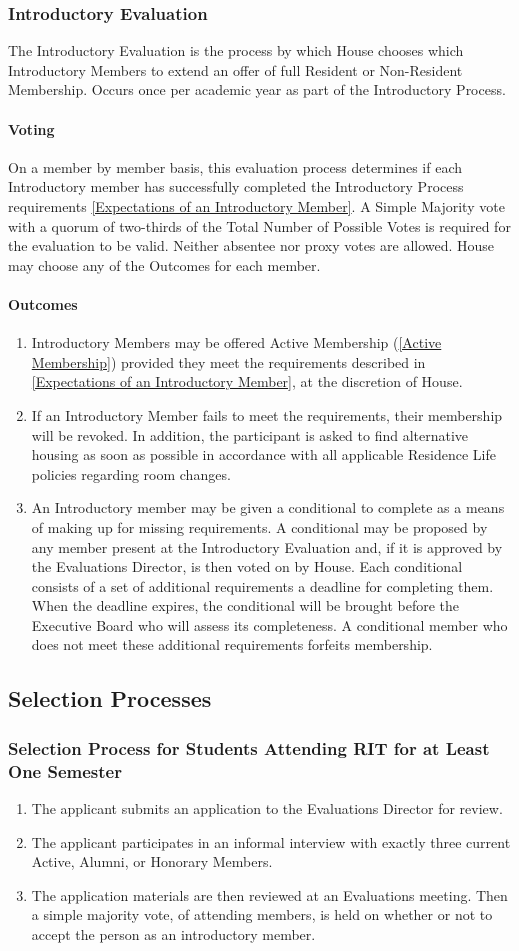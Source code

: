\documentclass{article}
\newcommand{\bsection}[1]{\subsection{#1} \label{#1}}
\newcommand{\bsubsection}[1]{\subsubsection{#1} \label{#1}}
\newcommand{\bsubsubsection}[1]{\paragraph{#1} \label{#1}}
\begin{document}
\bsubsection{Introductory Evaluation}
The Introductory Evaluation is the process by which House chooses which Introductory Members to extend an offer of full Resident or Non-Resident Membership. Occurs once per academic year as part of the Introductory Process.
\bsubsubsection{Voting} 
On a member by member basis, this evaluation process determines if each Introductory member has successfully completed the Introductory Process requirements \ref{Expectations of an Introductory Member}. A Simple Majority vote with a quorum of two-thirds of the Total Number of Possible Votes is required for the evaluation to be valid. Neither absentee nor proxy votes are allowed. House may choose any of the Outcomes for each member.
\bsubsubsection{Outcomes} 
\renewcommand{\theenumi}{\alph{enumi}} %
\begin{enumerate}
	\item Introductory Members may be offered Active Membership (\ref{Active Membership}) provided they meet the requirements described in \ref{Expectations of an Introductory Member}, at the discretion of House.
	\item If an Introductory Member fails to meet the requirements, their membership will be revoked.
		In addition, the participant is asked to find alternative housing as soon as possible in accordance with all applicable Residence Life policies regarding room changes.
	\item An Introductory member may be given a conditional to complete as a means of making up for missing requirements.
		A conditional may be proposed by any member present at the Introductory Evaluation and, if it is approved by the Evaluations Director, is then voted on by House.
		Each conditional consists of a set of additional requirements a deadline for completing them.
		When the deadline expires, the conditional will be brought before the Executive Board who will assess its completeness. A conditional member who does not meet these additional requirements forfeits membership.
\end{enumerate}
\bsection{Selection Processes}
\renewcommand{\theenumi}{\alph{enumi}} %
\bsubsection{Selection Process for Students Attending RIT for at Least One Semester}
\begin{enumerate}
	\item The applicant submits an application to the Evaluations Director for review.
	\item The applicant participates in an informal interview with exactly three current Active, Alumni, or Honorary Members.
	\item The application materials are then reviewed at an Evaluations meeting. 
	Then a simple majority vote, of attending members, is held on whether or not to accept the person as an introductory member.
\end{enumerate}
\end{document}
